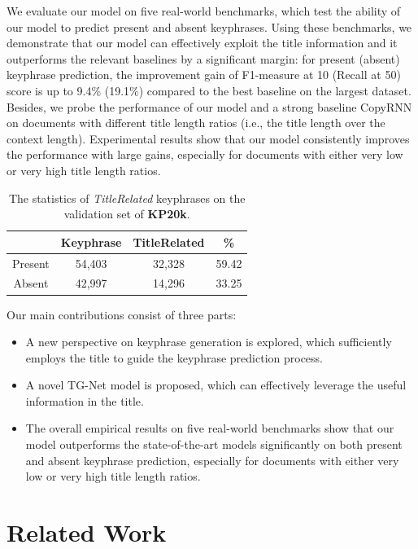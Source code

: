 \documentclass[letterpaper]{article} %
\begin{document}
We evaluate our model on five real-world benchmarks, which test the ability of our model to predict present and absent keyphrases. Using these benchmarks, we demonstrate that our model can effectively exploit the title information and it outperforms the relevant baselines by a significant margin: for present (absent) keyphrase prediction, the improvement gain of F1-measure at 10 (Recall at 50) score is up to 9.4\% (19.1\%) compared to the best baseline on the largest dataset. Besides, we probe the performance of our model and a strong baseline CopyRNN on documents with different title length ratios (i.e., the title length over the context length). Experimental results show that our model consistently improves the performance with large gains, especially for documents with either very low or very high title length ratios.

\begin{table}[t]
\centering
\begin{tabular}{ c c c c}
\hline
\hline
 & Keyphrase & TitleRelated & \% \\
\hline
Present & 54,403 & 32,328 & 59.42 \\
\hline
Absent & 42,997  & 14,296 & 33.25\\
\hline
\end{tabular}
\caption{The statistics of \textit{TitleRelated} keyphrases on the validation set of \textbf{KP20k}.}
\label{table:statistic_study_on_val_set}
\end{table}

Our main contributions consist of three parts:
\begin{itemize}
\item A new perspective on keyphrase generation is explored, which sufficiently employs the title to guide the keyphrase prediction process.
\item A novel TG-Net model is proposed, which can effectively leverage the useful information in the title.
\item  The overall empirical results on five real-world benchmarks show that our model outperforms the state-of-the-art models significantly on both present and absent keyphrase prediction, especially for documents with either very low or very high title length ratios.
\end{itemize}


\section{Related Work} \label{section: related_work}
\end{document}
